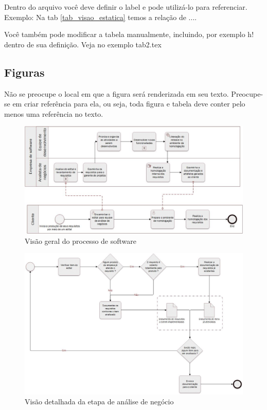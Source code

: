 \documentclass[	DIV=calc,%
							paper=a4,%
							fontsize=12pt,%
							onecolumn]{scrartcl}	 					%
\begin{document}


Dentro do arquivo você deve definir o label e pode utilizá-lo para referenciar. Exemplo:
Na tab \ref{tab_visao_estatica} temos a relação de ....


Você também pode modificar a tabela manualmente, incluindo, por exemplo h! dentro de sua definição. Veja no exemplo tab2.tex

\subsection{Figuras}

Não se preocupe o local em que a figura será renderizada em seu texto. Preocupe-se em criar referência para ela, ou seja, toda figura e tabela deve conter pelo menos uma referência no texto.

\begin{figure}
\centering
\includegraphics[width=\textwidth]{processo_de_software_BPMN1}
\caption{Visão geral do processo de software}
\end{figure}


\begin{figure}
	\centering
	\includegraphics[width=\textwidth]{processo_de_software_BPMN2}
	\caption{Visão detalhada da etapa de análise de negócio}
	\label{fig2}
\end{figure}
\end{document}

